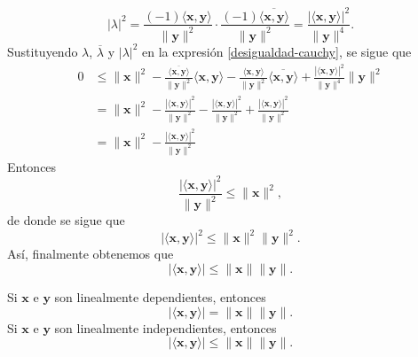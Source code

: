 \begin{theorem}
    $$|\lambda|^2 = \frac{(-1)\langle \mathbf{x}, \mathbf{y} \rangle}{\| \mathbf{y} \|^2} \cdot \frac{(-1)\overline{\langle \mathbf{x}, \mathbf{y} \rangle}}{\| \mathbf{y} \|^2} = \frac{|\langle \mathbf{x}, \mathbf{y} \rangle|^2}{\| \mathbf{y} \|^4}.$$
    Sustituyendo $\lambda$, $\overline{\lambda}$ y $|\lambda|^2$ en la expresión \eqref{desigualdad-cauchy}, se sigue que
    \begin{align*}
        0 & \leq \| \mathbf{x} \|^2 - \frac{\overline{\langle \mathbf{x}, \mathbf{y} \rangle}}{\| \mathbf{y} \|^2} \langle \mathbf{x}, \mathbf{y} \rangle - \frac{\langle \mathbf{x}, \mathbf{y} \rangle}{\| \mathbf{y} \|^2} \overline{\langle \mathbf{x}, \mathbf{y} \rangle} + \frac{|\langle \mathbf{x}, \mathbf{y} \rangle|^2}{\| \mathbf{y} \|^4} \| \mathbf{y} \|^2 \\
        & = \| \mathbf{x} \|^2 - \frac{|\langle \mathbf{x}, \mathbf{y} \rangle|^2}{\| \mathbf{y} \|^2} - \frac{|\langle \mathbf{x}, \mathbf{y} \rangle|^2}{\| \mathbf{y} \|^2} + \frac{|\langle \mathbf{x}, \mathbf{y} \rangle|^2}{\| \mathbf{y} \|^2} \\
        & = \| \mathbf{x} \|^2 - \frac{|\langle \mathbf{x}, \mathbf{y} \rangle|^2}{\| \mathbf{y} \|^2}
    \end{align*}
    Entonces
    $$\frac{|\langle \mathbf{x}, \mathbf{y} \rangle|^2}{\| \mathbf{y} \|^2} \leq \| \mathbf{x} \|^2,$$
    de donde se sigue que
    $$|\langle \mathbf{x}, \mathbf{y} \rangle|^2 \leq \| \mathbf{x} \|^2 \| \mathbf{y} \|^2.$$\newpage\noindent
    Así, finalmente obtenemos que
    $$|\langle \mathbf{x}, \mathbf{y} \rangle| \leq \| \mathbf{x} \| \| \mathbf{y} \|.$$
\end{theorem}

\begin{observation}
    Si $\mathbf{x}$ e $\mathbf{y}$ son linealmente dependientes, entonces
    $$|\langle \mathbf{x}, \mathbf{y} \rangle| = \| \mathbf{x} \| \| \mathbf{y} \|.$$
    Si $\mathbf{x}$ e $\mathbf{y}$ son linealmente independientes, entonces
    $$|\langle \mathbf{x}, \mathbf{y} \rangle| \leq \| \mathbf{x} \| \| \mathbf{y} \|.$$
\end{observation}

